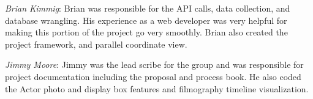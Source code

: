 \documentclass[12pt]{article}
\begin{document}
\textit{Brian Kimmig}: Brian was responsible for the API calls, data collection, and database wrangling. His experience as a web developer was very helpful for making this portion of the project go very smoothly. Brian also created the project framework, and parallel coordinate view.

\textit{Jimmy Moore}: Jimmy was the lead scribe for the group and was responsible for project documentation including the proposal and process book. He also coded the Actor photo and display box features and filmography timeline visualization.
\end{document}

